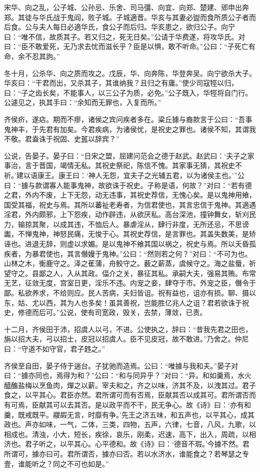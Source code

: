 \documentclass[a4paper,12pt,UTF8,twoside]{ctexbook}
\begin{document}
宋华、向之乱，公子城、公孙忌、乐舍、司马彊、向宜、向郑、楚建、郳申出奔郑。其徒与华氏战于鬼阎，败子城。子城適晋。华亥与其妻必盥而食所质公子者而后食。公与夫人每日必適华氏，食公子而后归。华亥患之，欲归公子。向宁曰：“唯不信，故质其子。若又归之，死无日矣。”公请于华费遂，将攻华氏。对曰：“臣不敢爱死，无乃求去忧而滋长乎？臣是以惧，敢不听命。”公曰：“子死亡有命，余不忍其訽。”

冬十月，公杀华、向之质而攻之。戊辰，华、向奔陈，华登奔吴。向宁欲杀大子。华亥曰：“干君而出，又杀其子，其谁纳我？且归之有庸。”使少司寇牼以归，曰：“子之齿长矣，不能事人，以三公子为质，必免。”公子既入，华牼将自门行。公遽见之，执其手曰：“余知而无罪也，入复而所。”

齐侯疥，遂痁。期而不瘳，诸侯之宾问疾者多在。粱丘據与裔款言于公曰：“吾事鬼神丰，于先君有加矣。今君疾病，为诸侯忧，是祝史之罪也。诸侯不知，其谓我不敬。君盍诛于祝固、史嚚以辞宾？”

公说，告晏子。晏子曰：“日宋之盟，屈建问范会之德于赵武。赵武曰：‘夫子之家事治，言于晋国，竭情无私。其祝史祭祀，陈信不愧。其家事无猜，其祝史不祈。’建以语康王。康王曰：‘神人无怨，宜夫子之光辅五君，以为诸侯主也。’”公曰：“據与款谓寡人能事鬼神，故欲诛于祝史。子称是语，何故？”对曰：“若有德之君，外内不废，上下无怨，动无违事，其祝史荐信，无愧心矣。是以鬼神用飨，国受其福，祝史与焉。其所以蕃祉老寿者，为信君使也，其言忠信于鬼神。其適遇淫君，外内颇邪，上下怨疾，动作辟违，从欲厌私。高台深池，撞钟舞女，斩刈民力，输掠其聚，以成其违，不恤后人。暴虐淫从，肆行非度，无所还忌，不思谤讟，不惮鬼神，神怒民痛，无悛于心。其祝史荐信，是言罪也。其盖失数美，是矫诬也。进退无辞，则虚以求媚。是以鬼神不飨其国以祸之，祝史与焉。所以夭昏孤疾者，为暴君使也，其言僭嫚于鬼神。”公曰：“然则若之何？”对曰：“不可为也。山林之木，衡鹿守之。泽之萑蒲，舟鲛守之。薮之薪蒸，虞候守之。海之盐蜃，祈望守之。县鄙之人，入从其政。偪介之关，暴征其私。承嗣大夫，强易其贿。布常无艺，征敛无度，宫室日更，淫乐不违。内宠之妾，肆夺于市。外宠之臣，僭令于鄙。私欲养求，不给则应。民人苦病，夫妇皆诅。祝有益也，诅亦有损。聊、摄以东，姑、尤以西，其为人也多矣！虽其善祝，岂能胜亿兆人之诅？君若欲诛于祝史，修德而后可。”公说，使有司宽政，毁关，去禁，薄敛，已责。

十二月，齐侯田于沛，招虞人以弓，不进。公使执之，辞曰：“昔我先君之田也，旃以招大夫，弓以招士，皮冠以招虞人。臣不见皮冠，故不敢进。”乃舍之。仲尼曰：“守道不如守官，君子韪之。”

齐侯至自田，晏子侍于遄台。子犹驰而造焉。公曰：“唯據与我和夫。”晏子对曰：“據亦同也，焉得为和？”公曰：“和与同异乎？”对曰：“异。和如羹焉，水火醯醢盐梅以烹鱼肉，燀之以薪。宰夫和之，齐之以味，济其不及，以洩其过。君子食之，以平其心。君臣亦然。君所谓可而有否焉，臣献其否以成其可。君所谓否而有可焉，臣献其可以去其否。是以政平而不干，民无争心。故《诗》曰：‘亦有和羹，既戒既平。鬷嘏无言，时靡有争。’先王之济五味，和五声也，以平其心，成其政也。声亦如味，一气，二体，三类，四物，五声，六律，七音，八风，九歌，以相成也。清浊，小大，短长，疾徐，哀乐，刚柔，迟速，高下，出入，周疏，以相济也。君子听之，以平其心。心平德和。故《诗》曰：‘德音不瑕。’今據不然。君所谓可，據亦曰可。君所谓否，據亦曰否。若以水济水，谁能食之？若琴瑟之专壹，谁能听之？同之不可也如是。”
\end{document}
